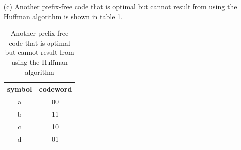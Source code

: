 \documentclass{assignment}
\begin{document}
\begin{sol}
\begin{itemize}
            \item[(c)] Another prefix-free code that is optimal but cannot result from using the Huffman algorithm is shown in table \ref{A-8-P-2-c}.
            \begin{table}[H]
                \centering
                \caption{Another prefix-free code that is optimal but cannot result from using the Huffman algorithm}
                \label{A-8-P-2-c}
                \begin{tabular}{|c|c|}
                \hline
                symbol & codeword \\ \hline
                a & 00 \\ \hline
                b & 11 \\ \hline
                c & 10 \\ \hline
                d & 01 \\ \hline
                \end{tabular}
            \end{table}
    \end{itemize}
\end{sol}
\end{document}

